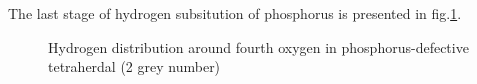 
The last stage of hydrogen subsitution of phosphorus is presented in fig.\ref{HinO1,2,3and4}. 

\begin{figure}[h]
\begin{minipage}[h]{0.5\linewidth}
\end{minipage}
\hfill
\begin{minipage}[h]{0.5\linewidth}
\end{minipage}
\caption{Hydrogen distribution around fourth oxygen in phosphorus-defective tetraherdal (2 grey number)}
\label{HinO1,2,3and4}
\end{figure}

